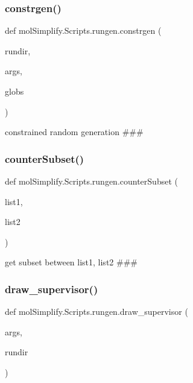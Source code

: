 \subsubsection{\texorpdfstring{constrgen()}{constrgen()}}
{\footnotesize\ttfamily def mol\+Simplify.\+Scripts.\+rungen.\+constrgen (\begin{DoxyParamCaption}\item[{}]{rundir,  }\item[{}]{args,  }\item[{}]{globs }\end{DoxyParamCaption})}



constrained random generation \#\#\# 

\mbox{\label{namespacemolSimplify_1_1Scripts_1_1rungen_af46815168bcc1608e7a0ba3eb472e565}} 
\subsubsection{\texorpdfstring{counter\+Subset()}{counterSubset()}}
{\footnotesize\ttfamily def mol\+Simplify.\+Scripts.\+rungen.\+counter\+Subset (\begin{DoxyParamCaption}\item[{}]{list1,  }\item[{}]{list2 }\end{DoxyParamCaption})}



get subset between list1, list2 \#\#\# 

\mbox{\label{namespacemolSimplify_1_1Scripts_1_1rungen_a22df8ce169a6b5a681188eb023ff2d42}} 
\subsubsection{\texorpdfstring{draw\+\_\+supervisor()}{draw\_supervisor()}}
{\footnotesize\ttfamily def mol\+Simplify.\+Scripts.\+rungen.\+draw\+\_\+supervisor (\begin{DoxyParamCaption}\item[{}]{args,  }\item[{}]{rundir }\end{DoxyParamCaption})}



